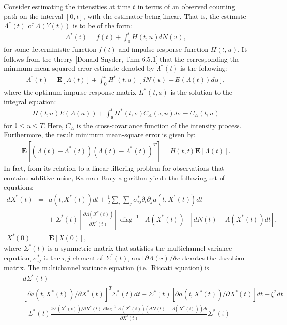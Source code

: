 \documentclass[12pt]{article}%
\begin{document}
Consider estimating the intensities at time $t$ in terms of an observed counting path on the interval $[0,t]$,
with the estimator being linear.  That is, the estimate $\Lambda^{*}(t)$ of $\Lambda(Y(t))$ is to be of 
the form:
\begin{eqnarray}
\Lambda^{*}(t) = f(t) + \int_0^t H(t,u) dN(u),
\end{eqnarray}
for some deterministic function $f(t)$ and impulse response function $H(t,u)$.  It follows from the theory [Donald Snyder, Thm 6.5.1] that the corresponding the minimum mean squared error estimate denoted by ${\Lambda}^*(t)$ is the following:
\begin{eqnarray}
{\Lambda}^*(t) = \mathbf E[\Lambda(t)] + \int_0^t H^*(t,u)\left[dN(u) - E(\Lambda(t))du\right],
\end{eqnarray}
where the optimum impulse response matrix $H^*(t,u)$ is the solution to the integral equation:
\begin{eqnarray}
H(t,u) E(\Lambda(u)) 
+
\int_0^t H^*(t,s) C_{\Lambda}(s,u) ds = C_{\Lambda}(t,u)
\end{eqnarray}
for $0 \le u \le T$.  Here, $C_{\Lambda}$ is the cross-covariance function 
of the intensity process.  
Furthermore, the result minimum mean-square error is given by:
\begin{eqnarray}
\mathbf E[(\Lambda(t) - {\Lambda}^*(t))(\Lambda(t) - {\Lambda}^*(t))^T] 
= 
H(t,t) \mathbf E[\Lambda(t)]. 
\end{eqnarray}
In fact, from its relation to a linear filtering problem 
for observations that contains additive noise, Kalman-Bucy algorithm yields
the following set of equations:
\begin{eqnarray*}
d{X}^*(t)
&= & a(t,X^*(t))dt + \frac{1}{2} \sum_{i} \sum_{j} \sigma_{ij}^* \partial_{i}\partial_{j} a(t,X^*(t)) dt \\
&\ & +\ \Sigma^*(t) \left[ \frac{\partial \Lambda(X^*(t)) }{\partial X^*(t)} \right] {\mathop{diag}}^{-1}\left[\Lambda(X^*(t))\right]\left[dN(t) - \Lambda(X^*(t))dt\right],\\
X^*(0) &=& \mathbf E[X(0)],
\end{eqnarray*} 
where $\Sigma^*(t)$ is a symmetric matrix that satisfies the multichannel variance equation,
$\sigma_{ij}^*$ is the $i,j$-element of $\Sigma^*(t)$, and $\partial \Lambda(x)/\partial x$ denotes the Jacobian matrix.  The multichannel variance equation (i.e.\ Riccati equation) is
\begin{eqnarray*}
&\ & d\Sigma^*(t) \\
&= &
\left[\partial a(t,X^*(t))/\partial X^*(t) \right]^T
\Sigma^*(t) dt 
+\Sigma^*(t) \left[\partial a(t,X^*(t)) /\partial X^*(t) \right]dt+ \xi^2 dt\\
&\ & -
\Sigma^*(t)
\frac{
\partial \Lambda(X^*(t))/\partial X^*(t) {\mathop{diag}}^{-1} \Lambda(X^*(t))(dN(t) - \Lambda(X^*(t)))dt
}{\partial X^*(t)}
\Sigma^*(t)
\end{eqnarray*}
\end{document}

